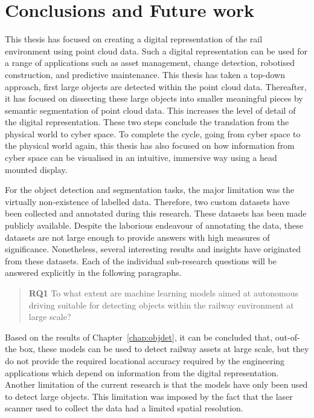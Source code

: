\chapter{Conclusions and Future work}\label{chap:conclusion}
This thesis has focused on creating a digital representation of the rail environment using point cloud data. Such a digital representation can be used for a range of applications such as asset management, change detection, robotised construction, and predictive maintenance. This thesis has taken a top-down approach, first large objects are detected within the point cloud data. Thereafter, it has focused on dissecting these large objects into smaller meaningful pieces by semantic segmentation of point cloud data. This increases the level of detail of the digital representation. These two steps conclude the translation from the physical world to cyber space. To complete the cycle, going from cyber space to the physical world again, this thesis has also focused on how information from cyber space can be visualised in an intuitive, immersive way using a head mounted display.

For the object detection and segmentation tasks, the major limitation was the virtually non-existence of labelled data. Therefore, two custom datasets have been collected and annotated during this research. These datasets has been made publicly available. Despite the laborious endeavour of annotating the data, these datasets are not large enough to provide answers with high measures of significance. Nonetheless, several interesting results and insights have originated from these datasets. Each of the individual sub-research questions will be answered explicitly in the following paragraphs.

\begin{quote}
    \textbf{RQ1} To what extent are machine learning models aimed at autonomous driving suitable for detecting objects within the railway environment at large scale?
\end{quote}
Based on the results of Chapter~\ref{chap:objdet}, it can be concluded that, out-of-the box, these models can be used to detect railway assets at large scale, but they do not provide the required locational accuracy required by the engineering applications which depend on information from the digital representation. Another limitation of the current research is that the models have only been used to detect large objects. This limitation was imposed by the fact that the laser scanner used to collect the data had a limited spatial resolution.

